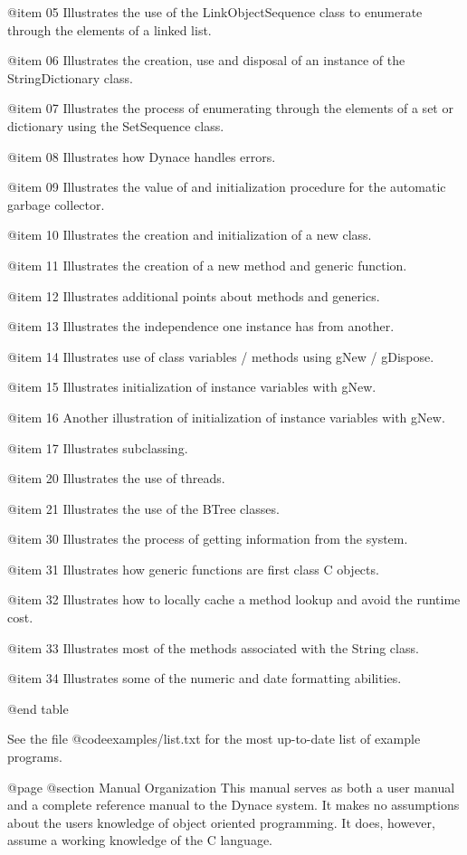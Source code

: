 @item 05
Illustrates the use of the LinkObjectSequence class to enumerate through
the elements of a linked list.

@item 06
Illustrates the creation, use and disposal of an instance of the
StringDictionary class.

@item 07
Illustrates the process of enumerating through the elements of a
set or dictionary using the SetSequence class.

@item 08
Illustrates how Dynace handles errors.

@item 09
Illustrates the value of and initialization procedure for the automatic
garbage collector.

@item 10
Illustrates the creation and initialization of a new class.

@item 11
Illustrates the creation of a new method and generic function.

@item 12
Illustrates additional points about methods and generics.

@item 13
Illustrates the independence one instance has from another.

@item 14
Illustrates use of class variables / methods using gNew / gDispose.

@item 15
Illustrates initialization of instance variables with gNew.

@item 16
Another illustration of initialization of instance variables with gNew.

@item 17
Illustrates subclassing.

@item 20
Illustrates the use of threads.

@item 21
Illustrates the use of the BTree classes.

@item 30
Illustrates the process of getting information from the system.

@item 31
Illustrates how generic functions are first class C objects.

@item 32
Illustrates how to locally cache a method lookup and avoid the
runtime cost.

@item 33
Illustrates most of the methods associated with the String class.

@item 34
Illustrates some of the numeric and date formatting abilities.

@end table


See the file @code{examples/list.txt} for the most up-to-date list
of example programs.


@page
@section Manual Organization
This manual serves as both a user manual and a complete reference manual
to the Dynace system.  It makes no assumptions about the users knowledge
of object oriented programming.  It does, however, assume a working
knowledge of the C language.

